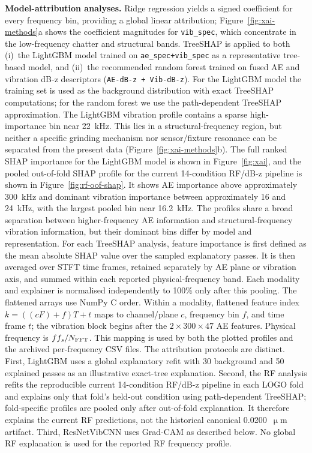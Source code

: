 \textbf{Model-attribution analyses.}
Ridge regression yields a signed coefficient for every frequency bin,
providing a global linear attribution; Figure~\ref{fig:xai-methods}a
shows the coefficient magnitudes for \texttt{vib\_spec}, which
concentrate in the low-frequency chatter and structural bands. TreeSHAP is applied to both (i)~the LightGBM model trained on
\texttt{ae\_spec+vib\_spec} as a representative tree-based model, and
(ii)~the recommended random forest trained on fused AE and vibration
dB-z descriptors (\texttt{AE-dB-z + Vib-dB-z}). For the
LightGBM model the training set is used as the background distribution
with exact TreeSHAP computations; for the random forest we use the
path-dependent TreeSHAP approximation. The LightGBM vibration profile
contains a sparse high-importance bin near 22~kHz. This lies in a
structural-frequency region, but neither a specific grinding mechanism nor
sensor/fixture resonance can be separated from the present data
(Figure~\ref{fig:xai-methods}b). The full ranked
SHAP importance for the LightGBM model is shown in Figure~\ref{fig:xai},
and the pooled out-of-fold SHAP profile for the current 14-condition RF/dB-z
pipeline is shown in Figure~\ref{fig:rf-oof-shap}. It shows
AE importance above approximately
300~kHz and dominant vibration importance between approximately 16 and
24~kHz, with the largest pooled bin near 16.2~kHz. The profiles share a broad separation between
higher-frequency AE information and structural-frequency vibration
information, but their dominant bins differ by model and representation.
For each TreeSHAP analysis, feature importance is first defined as the mean
absolute SHAP value over the sampled explanatory passes. It is then averaged
over STFT time frames, retained separately by AE plane or vibration axis,
and summed within each reported physical-frequency band. Each modality and
explainer is normalised independently to 100\% only after this pooling.
The flattened arrays use NumPy C order. Within a modality, flattened feature
index $k=((cF)+f)T+t$ maps to channel/plane $c$, frequency bin $f$, and time
frame $t$; the vibration block begins after the $2\times300\times47$ AE
features. Physical frequency is $f f_s/N_{\rm FFT}$. This mapping is used by
both the plotted profiles and the archived per-frequency CSV files.
The attribution protocols are distinct. First, LightGBM uses a global
explanatory refit with 30 background and 50 explained passes as an
illustrative exact-tree explanation. Second, the RF analysis refits the
reproducible current 14-condition RF/dB-z pipeline in each LOGO fold and
explains only that fold's held-out condition using path-dependent TreeSHAP;
fold-specific profiles are pooled only after out-of-fold explanation. It
therefore explains the current RF predictions, not the historical canonical
0.0200~\(\upmu\)m artifact. Third, ResNetVibCNN uses Grad-CAM as described
below. No global RF explanation is used for the reported RF frequency profile.

